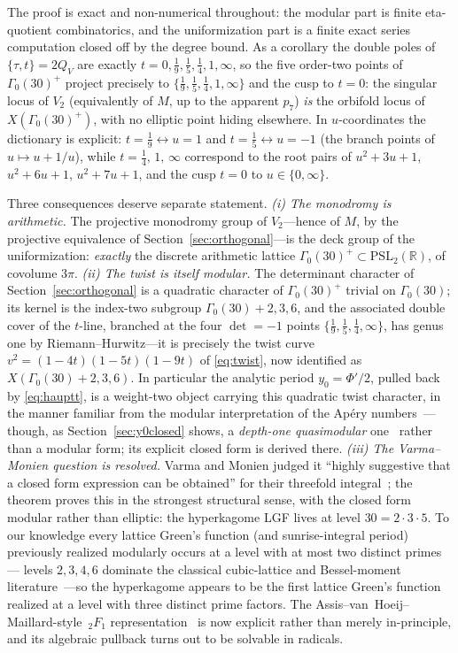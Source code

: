 \documentclass[cntp]{ipart}
\theoremstyle{plain}
\theoremstyle{remark}
\begin{document}
The proof is exact and non-numerical throughout: the modular part is finite eta-quotient combinatorics, and
the uniformization part is a finite exact series computation closed off by the degree bound. As a corollary
the double poles of $\{\tau,t\}=2Q_V$ are exactly $t=0,\tfrac19,\tfrac15,\tfrac14,1,\infty$, so the five
order-two points of $\Gamma_0(30)^+$ project precisely to $\{\tfrac19,\tfrac15,\tfrac14,1,\infty\}$ and the
cusp to $t=0$: the singular locus of $V_2$ (equivalently of $M$, up to the apparent $p_7$) \emph{is} the
orbifold locus of $X(\Gamma_0(30)^+)$, with no elliptic point hiding elsewhere. In $u$-coordinates the
dictionary is explicit: $t=\tfrac19\leftrightarrow u=1$ and $t=\tfrac15\leftrightarrow u=-1$ (the branch
points of $u\mapsto u+1/u$), while $t=\tfrac14,\,1,\,\infty$ correspond to the root pairs of $u^2+3u+1$,
$u^2+6u+1$, $u^2+7u+1$, and the cusp $t=0$ to $u\in\{0,\infty\}$.

Three consequences deserve separate statement. \emph{(i) The monodromy is arithmetic.} The projective
monodromy group of $V_2$---hence of $M$, by the projective equivalence of Section~\ref{sec:orthogonal}---is the
deck group of the uniformization: \emph{exactly} the discrete arithmetic lattice
$\Gamma_0(30)^+\subset\mathrm{PSL}_2(\mathbb{R})$, of covolume $3\pi$. \emph{(ii) The twist is itself
modular.} The determinant character of Section~\ref{sec:orthogonal} is a quadratic character of
$\Gamma_0(30)^+$ trivial on $\Gamma_0(30)$; its kernel is the index-two subgroup $\Gamma_0(30){+}2,3,6$, and
the associated double cover of the $t$-line, branched at the four $\det=-1$ points
$\{\tfrac19,\tfrac15,\tfrac14,\infty\}$, has genus one by Riemann--Hurwitz---it is precisely the twist curve
$v^2=(1-4t)(1-5t)(1-9t)$ of \eqref{eq:twist}, now identified as $X(\Gamma_0(30){+}2,3,6)$. In particular
the analytic period $y_0=\Phi'/2$, pulled back by \eqref{eq:hauptt}, is a weight-two object carrying this
quadratic twist character, in the manner familiar from the modular interpretation of the Ap\'ery
numbers~\cite{Beukers1987}---though, as Section~\ref{sec:y0closed} shows, a \emph{depth-one quasimodular}
one~\cite{Zagier2008} rather than a modular form; its explicit closed form is derived there. \emph{(iii) The Varma--Monien question is resolved.} Varma and Monien judged it ``highly
suggestive that a closed form expression can be obtained'' for their threefold integral~\cite{VarmaMonien2013};
the theorem proves this in the strongest structural sense, with the closed form modular rather than elliptic:
the hyperkagome LGF lives at level $30=2\cdot3\cdot5$. To our knowledge every lattice Green's function (and
sunrise-integral period) previously realized modularly occurs at a level with at most two distinct primes---
levels $2,3,4,6$ dominate the classical cubic-lattice and Bessel-moment
literature~\cite{Broadhurst2016,BlochKerrVanhove2015}---so the hyperkagome appears to be the first lattice
Green's function realized at a level with three distinct prime factors. The
Assis--van~Hoeij--Maillard-style $\,_2F_1$ representation~\cite{AVM2016} is now explicit rather than merely
in-principle, and its algebraic pullback turns out to be solvable in radicals.
\end{document}
